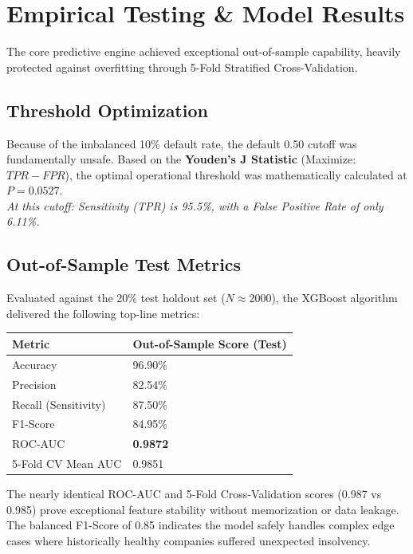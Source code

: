 \documentclass[11pt, a4paper]{article}
\begin{document}
\section{Empirical Testing \& Model Results}

The core predictive engine achieved exceptional out-of-sample capability, heavily protected against overfitting through 5-Fold Stratified Cross-Validation.

\subsection{Threshold Optimization}
Because of the imbalanced 10\% default rate, the default 0.50 cutoff was fundamentally unsafe. Based on the \textbf{Youden's J Statistic} (Maximize: $TPR - FPR$), the optimal operational threshold was mathematically calculated at \textbf{$P = 0.0527$}. \\
\textit{At this cutoff: Sensitivity (TPR) is 95.5\%, with a False Positive Rate of only 6.11\%.}

\subsection{Out-of-Sample Test Metrics}
Evaluated against the 20\% test holdout set ($N \approx 2000$), the XGBoost algorithm delivered the following top-line metrics:

\begin{table}[h!]\centering
\begin{tabular}{@{}ll@{}}
\toprule
\textbf{Metric} & \textbf{Out-of-Sample Score (Test)} \\ \midrule
Accuracy & 96.90\% \\
Precision & 82.54\% \\
Recall (Sensitivity) & 87.50\% \\
F1-Score & 84.95\% \\
ROC-AUC & \textbf{0.9872} \\
5-Fold CV Mean AUC & 0.9851 \\ \bottomrule
\end{tabular}
\end{table}

The nearly identical ROC-AUC and 5-Fold Cross-Validation scores (0.987 vs 0.985) prove exceptional feature stability without memorization or data leakage. The balanced F1-Score of 0.85 indicates the model safely handles complex edge cases where historically healthy companies suffered unexpected insolvency.
\end{document}
